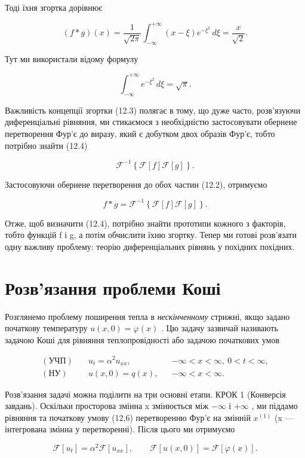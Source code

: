 \documentclass[
  ukrainian,
]{article}
\begin{document}
Тоді їхня згортка дорівнює

\[
(f*g)(x) = \frac{1}{\sqrt{2\pi}} \int_{-\infty}^{+\infty} (x-\xi)e^{-\xi^2}\,d\xi = \frac{x}{\sqrt{2}}.
\]

Тут ми використали відому формулу

\[
\int_{-\infty}^{+\infty} e^{-\xi^2}\,d\xi = \sqrt{\pi}.
\]

Важливість концепції згортки (12.3) полягає в тому, що дуже часто,
розв'язуючи диференціальні рівняння, ми стикаємося з необхідністю
застосовувати обернене перетворення Фур'є до виразу, який є добутком
двох образів Фур'є, тобто потрібно знайти (12.4)

\[
\mathcal{F}^{-1}\left\{\mathcal{F}[f]\mathcal{F}[g]\right\}.
\]

Застосовуючи обернене перетворення до обох частин (12.2), отримуємо

\[
f * g = \mathcal{F}^{-1}\left\{\mathcal{F}[f]\mathcal{F}[g]\right\}.
\]

Отже, щоб визначити (12.4), потрібно знайти прототипи кожного з
факторів, тобто функцій f і g, а потім обчислити їхню згортку. Тепер ми
готові розв'язати одну важливу проблему: теорію диференціальних рівнянь
у похідних похідних.

\section{Розв'язання проблеми
Коші}\label{ux440ux43eux437ux432ux44fux437ux430ux43dux43dux44f-ux43fux440ux43eux431ux43bux435ux43cux438-ux43aux43eux448ux456}

Розглянемо проблему поширення тепла в \emph{нескінченному} стрижні, якщо
задано початкову температуру \(u(x, 0) = \varphi(x)\) . Цю задачу
зазвичай називають задачою Коші для рівняння теплопровідності або
задачою початкових умов

\[
\begin{aligned}
(\text{УЧП})\quad & u_t=\alpha^2u_{xx}, && -\infty<x<\infty,\ 0<t<\infty,\\
(\text{НУ})\quad & u(x,0)=q(x), && -\infty<x<\infty.
\end{aligned}
\]

Розв'язання задачі можна поділити на три основні етапи. КРОК 1
(Конверсія завдань). Оскільки просторова змінна x змінюється між
\(-\infty\) і \(+\infty\) , ми піддамо рівняння та початкову умову
(12,6) перетворенню Фур'є на змінній \(x^{(1)}\) (x --- інтегрована
змінна у перетворенні). Після цього ми отримуємо

\[
\mathcal{F}[u_t] = \alpha^2 \mathcal{F}[u_{xx}],\qquad
\mathcal{F}[u(x,0)] = \mathcal{F}[\varphi(x)].
\]
\end{document}
